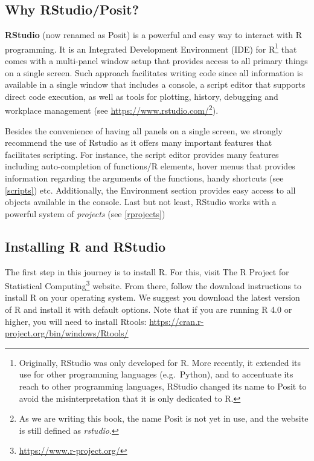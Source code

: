 \documentclass[
]{krantz}
\renewcommand{\href}[2]{#2\footnote{\url{#1}}}
\begin{document}
\hypertarget{rstudio}{%
\subsection{Why RStudio/Posit?}\label{rstudio}}

\textbf{RStudio} (now renamed as Posit) is a powerful and easy way to interact with R programming. It is an Integrated Development Environment (IDE) for R\footnote{Originally, RStudio was only developed for R. More recently, it extended its use for other programming languages (e.g.~Python), and to accentuate its reach to other programming languages, RStudio changed its name to Posit to avoid the misinterpretation that it is only dedicated to R.} that comes with a multi-panel window setup that provides access to all primary things on a single screen. Such approach facilitates writing code since all information is available in a single window that includes a console, a script editor that supports direct code execution, as well as tools for plotting, history, debugging and workplace management (see \url{https://www.rstudio.com/}\footnote{As we are writing this book, the name Posit is not yet in use, and the website is still defined as \emph{rstudio}.}).

Besides the convenience of having all panels on a single screen, we strongly recommend the use of Rstudio as it offers many important features that facilitates scripting. For instance, the script editor provides many features including auto-completion of functions/R elements, hover menus that provides information regarding the arguments of the functions, handy shortcuts (see \ref{scripts}) etc. Additionally, the Environment section provides easy access to all objects available in the console. Last but not least, RStudio works with a powerful system of \emph{projects} (see \ref{rprojects})

\hypertarget{installing-r-and-rstudio}{%
\subsection{Installing R and RStudio}\label{installing-r-and-rstudio}}

The first step in this journey is to install R. For this, visit \href{https://www.r-project.org/}{The R Project for Statistical Computing} website. From there, follow the download instructions to install R on your operating system. We suggest you download the latest version of R and install it with default options. Note that if you are running R 4.0 or higher, you will need to install Rtools:
\url{https://cran.r-project.org/bin/windows/Rtools/}
\end{document}
